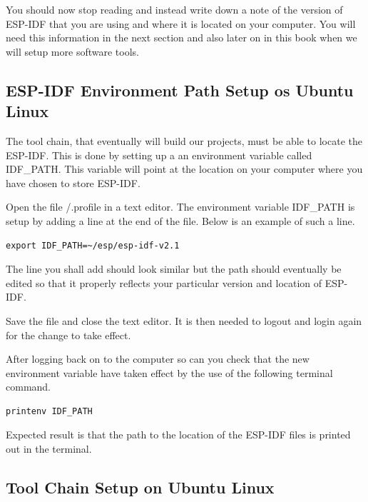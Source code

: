 \documentclass{tufte-book}
\begin{document}
You should now stop reading and instead write down a note of the version of ESP-IDF that you are using and where it is located on your computer. You will need this information in the next section and also later on in this book when we will setup more software tools.

\subsection{ESP-IDF Environment Path Setup os Ubuntu Linux}


The tool chain, that eventually will build our projects, must be able to locate the ESP-IDF. This is done by setting up a an environment variable called IDF\_PATH. This variable will point at the location on your computer where you have chosen to store ESP-IDF.

Open the file \texttildelow/.profile in a text editor. The environment variable IDF\_PATH is setup by adding a line at the end of the file. Below is an example of such a line.


\begin{lstlisting}
export IDF_PATH=~/esp/esp-idf-v2.1
\end{lstlisting}

The line you shall add should look similar but the path should  eventually be edited so that it properly reflects your particular version and location of ESP-IDF.

Save the file and close the text editor. It is then needed to logout and login again for the change to take effect.

After logging back on to the computer so can you check that the new environment variable have taken effect by the use of the following terminal command.

\begin{lstlisting}
printenv IDF_PATH
\end{lstlisting}

Expected result is that the path to the location of the ESP-IDF files is printed out in the terminal.

\subsection{Tool Chain Setup on Ubuntu Linux}
\end{document}
